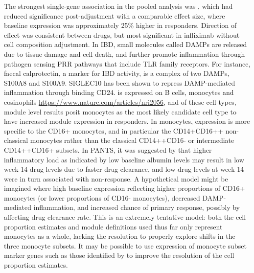 \begin{outline}
The strongest single-gene association in the pooled analysis was , 
which had reduced significance post-adjustment with a comparable effect size,
where baseline expression was approximately 25\% higher in responders.
Direction of effect was consistent between drugs, but most significant in infliximab without cell composition adjustment.
In \gls{IBD}, small molecules called \glspl{DAMP} are released due to tissue damage and cell death, 
and further promote inflammation through pathogen sensing \gls{PRR} pathways that include \gls{TLR} family receptors\autocite{boyapati2016GutMucosalDAMPs,desouza2016ImmunopathogenesisIBDCurrent}.
For instance, faecal calprotectin, a marker for \gls{IBD} activity, is a complex of two \glspl{DAMP}, S100A8 and S100A9\autocite{desouza2016ImmunopathogenesisIBDCurrent}.
SIGLEC10 has been shown to repress \gls{DAMP}-mediated inflammation through binding CD24\autocite{boyapati2016GutMucosalDAMPs}.
 is expressed on B cells, monocytes and eosinophils \url{https://www.nature.com/articles/nri2056},
and of these cell types, module level results posit monocytes as the most likely candidate cell type to have increased module expression in responders.
In monocytes,  expression is more specific to the CD16+ monocytes\autocite{martinez2009TranscriptomeHumanMonocyte},
and in particular the CD14+CD16++ non-classical monocytes rather than the classical CD14++CD16- or intermediate CD14++CD16+ subsets\autocite{villani2017SinglecellRNAseqReveals}.
In \gls{PANTS}, it was suggested by \textcite{kennedy2019PredictorsAntiTNFTreatment} that higher inflammatory load as indicated by low baseline albumin levels 
may result in low week 14 drug levels due to faster drug clearance,
and low drug levels at week 14 were in turn associated with non-response.
A hypothetical model might be imagined where high baseline  expression reflecting 
higher proportions of CD16+ monocytes (or lower proportions of CD16- monocytes),
decreased \gls{DAMP}-mediated inflammation, 
and increased chance of primary response, possibly by affecting drug clearance rate.
This is an extremely tentative model:
both the cell proportion estimates and module definitions used thus far only represent monocytes as a whole,
lacking the resolution to properly explore shifts in the three monocyte subsets.
It may be possible to use expression of monocyte subset marker genes such as those identified by \textcite{villani2017SinglecellRNAseqReveals} to improve the resolution of the cell proportion estimates.


\end{outline}

